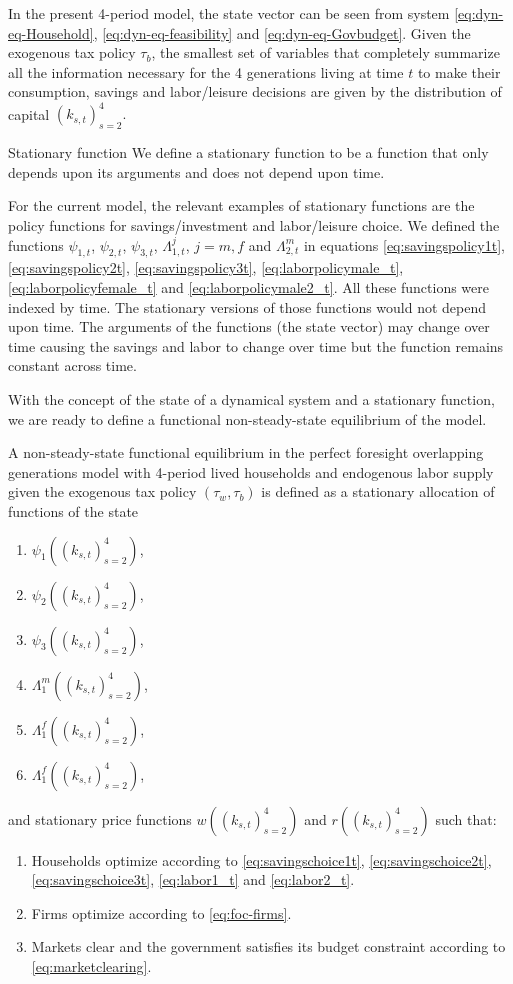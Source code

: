 \documentclass[ProjectUYA]{subfiles}
\begin{document}
In the present 4-period model, the state vector can be seen from system \eqref{eq:dyn-eq-Household}, \eqref{eq:dyn-eq-feasibility} and \eqref{eq:dyn-eq-Govbudget}. Given the exogenous tax policy 
$\tau_b$, the smallest set of variables that completely summarize all the information necessary for the 4 generations living at time $t$ to make their consumption, savings and labor/leisure decisions  are given by the distribution of capital $(k_{s,t})_{s=2}^4.$


	{Stationary function}
	We define a stationary function to be a function that only depends upon its arguments and does not depend upon time. 


For the current model, the relevant examples of stationary functions are the policy functions for savings/investment and labor/leisure choice. 
We defined the functions $\psi_{1,t}$, $\psi_{2,t}$, $\psi_{3,t}$, $\Lambda_{1,t}^j$, $j=m,f$ and $\Lambda_{2,t}^m$ in equations \eqref{eq:savingspolicy1t}, \eqref{eq:savingspolicy2t}, \eqref{eq:savingspolicy3t}, \eqref{eq:laborpolicymale_t}, \eqref{eq:laborpolicyfemale_t} and
 \eqref{eq:laborpolicymale2_t}. All these functions were indexed by time. The stationary versions of those functions would not depend upon time. The arguments of the functions (the state vector) may change over time causing the savings and labor to change over time but the function remains constant across time. 

 With the concept of the state of a dynamical system and a stationary function, we are ready to define a functional non-steady-state equilibrium of the model. 


 
 	
 	A non-steady-state functional equilibrium in the perfect foresight overlapping generations model with 4-period lived households and endogenous labor supply given the exogenous tax policy $(\tau_w,\tau_b)$ is defined as a stationary allocation of functions of the state 
 	\begin{enumerate}
 		\item $\psi_1((k_{s,t})_{s=2}^4)$,
 		\item $\psi_2((k_{s,t})_{s=2}^4)$,
 		\item $\psi_3((k_{s,t})_{s=2}^4)$,
 		\item $\Lambda_1^m((k_{s,t})_{s=2}^4)$,
 		\item $\Lambda_1^f((k_{s,t})_{s=2}^4)$,
 		\item $\Lambda_1^f((k_{s,t})_{s=2}^4)$,
 	\end{enumerate}
and stationary price functions $w((k_{s,t})_{s=2}^4)$ and $r((k_{s,t})_{s=2}^4)$ such that:
\begin{enumerate}
	\item Households optimize according to \eqref{eq:savingschoice1t}, \eqref{eq:savingschoice2t},
	 \eqref{eq:savingschoice3t}, \eqref{eq:labor1_t} and \eqref{eq:labor2_t}.
	\item Firms optimize according to \eqref{eq:foc-firms}.
	\item Markets clear and the government satisfies its budget constraint according to \eqref{eq:marketclearing}.
\end{enumerate}
\end{document}
